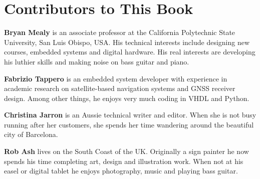 %
%
\chapter{Contributors to This Book}

\noindent
\textbf{Bryan Mealy} is an associate professor at the California Polytechnic State University, San Luis Obispo, USA. His technical interests include designing new courses, embedded systems and digital hardware. His real interests are developing his luthier skills and making noise on bass guitar and piano.

\noindent
\textbf{Fabrizio Tappero} is an embedded system developer with experience in academic research on satellite-based navigation systems and GNSS receiver design. Among other things, he enjoys very much coding in VHDL and Python.

\noindent
\textbf{Christina Jarron} is an Aussie technical writer and editor. When she is not busy running after her customers, she spends her time wandering around the beautiful city of Barcelona. 

\noindent
\textbf{Rob Ash} lives on the South Coast of the UK. Originally a sign painter he now spends his time completing art, design and illustration work. When not at his easel or digital tablet he enjoys photography, music and playing bass guitar.

